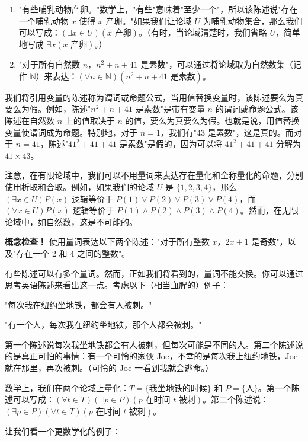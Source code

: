 \documentclass[11pt]{article}
\begin{document}
\begin{enumerate}
\item "有些哺乳动物产卵。"数学上，"有些"意味着"至少一个"，所以该陈述说"存在一个哺乳动物 $x$ 使得 $x$ 产卵。"如果我们让论域 $U$ 为哺乳动物集合，那么我们可以写成：$(\exists x \in U)(x \text{ 产卵})$。（有时，当论域清楚时，我们省略 $U$，简单地写成 $\exists x(x \text{ 产卵})$。）

\item "对于所有自然数 $n$，$n^2 + n + 41$ 是素数"，可以通过将论域取为自然数集（记作 $\mathbb{N}$）来表达：$(\forall n \in \mathbb{N})(n^2 + n + 41 \text{ 是素数})$。
\end{enumerate}

我们将引用变量的陈述称为谓词或命题公式，当用值替换变量时，该陈述要么为真要么为假。例如，陈述"$n^2 + n + 41$ 是素数"是带有变量 $n$ 的谓词或命题公式。该陈述在自然数 $n$ 上的值取决于 $n$ 的值，要么为真要么为假。也就是说，用值替换变量使谓词成为命题。特别地，对于 $n = 1$，我们有"43 是素数"，这是真的。而对于 $n = 41$，陈述"$41^2 + 41 + 41$ 是素数"是假的，因为可以将 $41^2 + 41 + 41$ 分解为 $41 \times 43$。

注意，在有限论域中，我们可以不用量词来表达存在量化和全称量化的命题，分别使用析取和合取。例如，如果我们的论域 $U$ 是 $\{1, 2, 3, 4\}$，那么 $(\exists x \in U)P(x)$ 逻辑等价于 $P(1) \lor P(2) \lor P(3) \lor P(4)$，而 $(\forall x \in U)P(x)$ 逻辑等价于 $P(1) \land P(2) \land P(3) \land P(4)$。然而，在无限论域中，如自然数，这是不可能的。

\textbf{概念检查！} 使用量词表达以下两个陈述："对于所有整数 $x$，$2x + 1$ 是奇数"，以及"存在一个 2 和 4 之间的整数"。

有些陈述可以有多个量词。然而，正如我们将看到的，量词不能交换。你可以通过思考英语陈述来看出这一点。考虑以下（相当血腥的）例子：

"每次我在纽约坐地铁，都会有人被刺。"

"有一个人，每次我在纽约坐地铁，那个人都会被刺。"

第一个陈述说每次我坐地铁都会有人被刺，但每次可能是不同的人。第二个陈述说的是真正可怕的事情：有一个可怜的家伙 Joe，不幸的是每次我上纽约地铁，Joe 就在那里，再次被刺。（可怜的 Joe 一看到我就会逃命。）

数学上，我们在两个论域上量化：$T = \{\text{我坐地铁的时候}\}$ 和 $P = \{\text{人}\}$。第一个陈述可以写成：$(\forall t \in T)(\exists p \in P)(p \text{ 在时间 } t \text{ 被刺})$。第二个陈述说：$(\exists p \in P)(\forall t \in T)(p \text{ 在时间 } t \text{ 被刺})$。

让我们看一个更数学化的例子：
\end{document}
